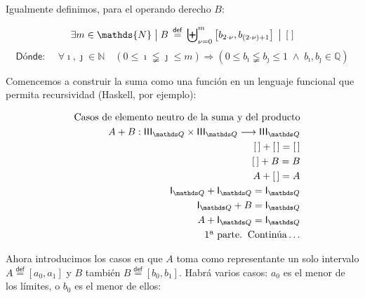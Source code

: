 \documentclass[final,12pt,a4paper,twoside,fleqn]{extbook}
\newcommand{\sthen}{\ensuremath{\Longrightarrow}}
\newcommand{\fromto}{\ensuremath{\longrightarrow}}
\newcommand{\mathdef}{\ensuremath{\stackrel{\mathsf{def}}{{}={}}}}
\newcommand{\then}{\ensuremath{\sthen}}
\newcommand{\setN}{\ensuremath{\mathds{N}}}
\newcommand{\setQ}{\ensuremath{\mathds{Q}}}
\theoremstyle{definition}
\theoremstyle{remark}
\begin{document}
	Igualmente definimos, para el operando derecho \(B\):



\begin{equation}
\exists m \in \setN \;\big{|}\; B \mathdef
\displaystyle{{\biguplus}_{\nu=0}^{m}} \left[
b_{2 \cdot \nu}, b_{{\left( 2 \cdot \nu \right)} + 1} \right] \; \bf{ \big{|}
} \; \left[ \; \right]
\end{equation}
\begin{equation}
\textsf{Dónde:    }\quad \forall \imath,\jmath \in \setN \quad \left( 0 \leq
\imath \lneqq \jmath \leq m \right) \then \left( 0 \leq b_{\imath} \lneqq
b_{\jmath} \leq 1\;  \land \; b_{\imath}, b_{\jmath}\in \setQ \right)
\end{equation}



	Comencemos a construir la suma como una función en un lenguaje funcional
que permita recursividad (Haskell, por ejemplo):



\begin{eqnarray}
\nonumber
&&\text{Casos de elemento neutro de la suma y del producto}\\
&&A + B : \IIIQ \times \IIIQ \fromto \IIIQ\\
&&      \left[\,\right] + \left[\,\right] = \left[\,\right]\\
&&      \left[\,\right] + B = B\\
&&      A + \left[\,\right] = A\\
&&      \IQ + \IQ = \IQ\\
&&      \IQ + B   = \IQ\\
&&      A   + \IQ = \IQ\\ \nonumber
&&      \text{1ª parte.}\;\;\text{Continúa}\ldots
\end{eqnarray}



	Ahora introducimos los casos en que \(A\) toma como representante un solo
intervalo \( A \mathdef \left[ a_0, a_1 \right] \) y \(B\) también \(B
\mathdef \left[ b_0, b_1 \right] \). Habrá varios casos: \(a_0\) es el menor
de los límites, o \(b_0\) es el menor de ellos:
\end{document}
